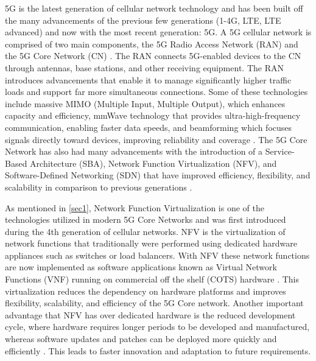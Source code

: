 \documentclass[final,1p,times,authoryear]{elsarticle}
\begin{document}
\vspace{1em}

5G is the latest generation of cellular network technology and has been built off the many advancements of the previous few generations (1-4G, LTE, LTE advanced) and now with the most recent generation: 5G. A 5G cellular network is comprised of two main components, the 5G Radio Access Network (RAN) and the 5G Core Network (CN) \citep{cardoso2020softwarized}. The RAN connects 5G-enabled devices to the CN through antennas, base stations, and other receiving equipment. The RAN introduces advancements that enable it to manage significantly higher traffic loads and support far more simultaneous connections. Some of these technologies include massive MIMO (Multiple Input, Multiple Output), which enhances capacity and efficiency, mmWave technology that provides ultra-high-frequency communication, enabling faster data speeds, and beamforming which focuses signals directly toward devices, improving reliability and coverage \citep{smith2023example}. The 5G Core Network has also had many advancements with the introduction of a Service-Based Architecture (SBA), Network Function Virtualization (NFV), and Software-Defined Networking (SDN) that have improved efficiency, flexibility, and scalability in comparison to previous generations \citep{condoluci2018softwarization}.

\vspace{1em}

As mentioned in \ref{sec1}, Network Function Virtualization is one of the technologies utilized in modern 5G Core Networks and was first introduced during the 4th generation of cellular networks. NFV is the virtualization of network functions that traditionally were performed using dedicated hardware appliances such as switches or load balancers. With NFV these network functions are now implemented as software applications known as Virtual Network Functions (VNF) running on commercial off the shelf (COTS) hardware \citep{sharevski2018towards}. This virtualization reduces the dependency on hardware platforms and improves flexibility, scalability, and efficiency of the 5G Core network. Another important advantage that NFV has over dedicated hardware is the reduced development cycle, where hardware requires longer periods to be developed and manufactured, whereas software updates and patches can be deployed more quickly and efficiently \citep{condoluci2018softwarization}. This leads to faster innovation and adaptation to future requirements.
\end{document}
